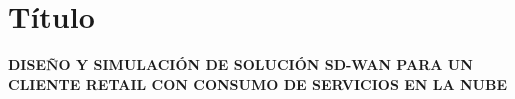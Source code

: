 \chapter{Título}
\label{cha:Título}


\textbf{DISEÑO Y SIMULACIÓN DE SOLUCIÓN SD-WAN PARA UN CLIENTE RETAIL CON CONSUMO DE SERVICIOS EN LA NUBE}
\\
\\



